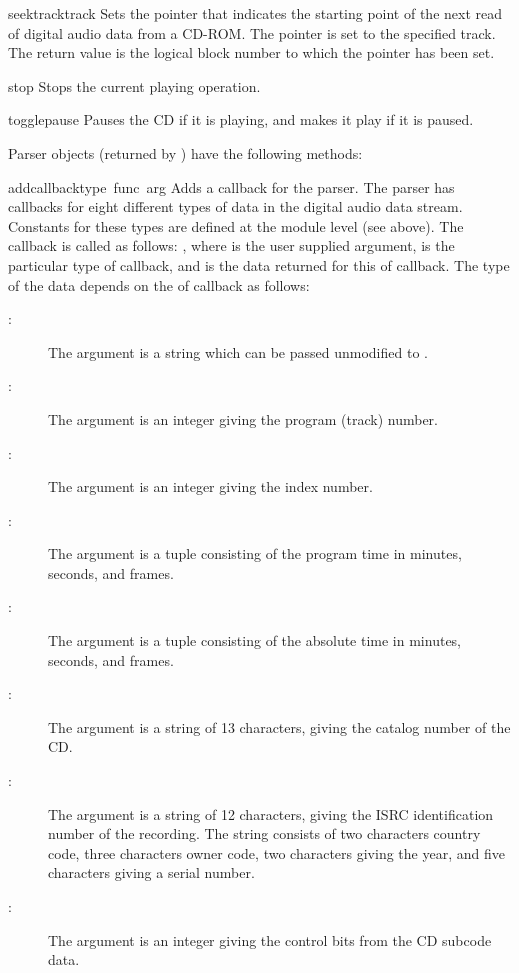 \begin{funcdesc}{seektrack}{track}
Sets the pointer that indicates the starting point of the next read of
digital audio data from a CD-ROM.  The pointer is set to the specified
track.  The return value is the logical block number to which the
pointer has been set.
\end{funcdesc}

\begin{funcdesc}{stop}{}
Stops the current playing operation.
\end{funcdesc}

\begin{funcdesc}{togglepause}{}
Pauses the CD if it is playing, and makes it play if it is paused.
\end{funcdesc}

Parser objects (returned by ) have the
following methods:

\renewcommand{\indexsubitem}{(CD parser object method)}

\begin{funcdesc}{addcallback}{type\, func\, arg}
Adds a callback for the parser.  The parser has callbacks for eight
different types of data in the digital audio data stream.  Constants
for these types are defined at the  module level (see above).
The callback is called as follows: , where
 is the user supplied argument,  is the
particular type of callback, and  is the data returned for
this  of callback.  The type of the data depends on the
 of callback as follows:
\begin{description}
\item[: ]
The argument is a string which can be passed unmodified to
.
\item[: ]
The argument is an integer giving the program (track) number.
\item[: ]
The argument is an integer giving the index number.
\item[: ]
The argument is a tuple consisting of the program time in minutes,
seconds, and frames.
\item[: ]
The argument is a tuple consisting of the absolute time in minutes,
seconds, and frames.
\item[: ]
The argument is a string of 13 characters, giving the catalog number
of the CD.
\item[: ]
The argument is a string of 12 characters, giving the ISRC
identification number of the recording.  The string consists of two
characters country code, three characters owner code, two characters
giving the year, and five characters giving a serial number.
\item[: ]
The argument is an integer giving the control bits from the CD subcode
data.
\end{description}
\end{funcdesc}

